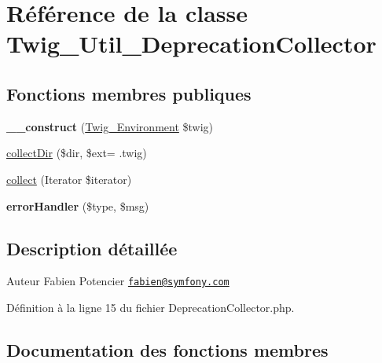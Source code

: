 \hypertarget{class_twig___util___deprecation_collector}{}\section{Référence de la classe Twig\+\_\+\+Util\+\_\+\+Deprecation\+Collector}
\label{class_twig___util___deprecation_collector}
\subsection*{Fonctions membres publiques}
\begin{DoxyCompactItemize}
\item 
{\bfseries \+\_\+\+\_\+construct} (\hyperlink{class_twig___environment}{Twig\+\_\+\+Environment} \$twig)\hypertarget{class_twig___util___deprecation_collector_a3ae6b2b479d74d398b2d4161783f029c}{}\label{class_twig___util___deprecation_collector_a3ae6b2b479d74d398b2d4161783f029c}

\item 
\hyperlink{class_twig___util___deprecation_collector_a143e2c1552dc387f641df324128a2d3a}{collect\+Dir} (\$dir, \$ext= \textquotesingle{}.twig\textquotesingle{})
\item 
\hyperlink{class_twig___util___deprecation_collector_a72236c842cab8f73c3323f5b83b45bb2}{collect} (Iterator \$iterator)
\item 
{\bfseries error\+Handler} (\$type, \$msg)\hypertarget{class_twig___util___deprecation_collector_a1615d0d9ad54d515605692a70756eb91}{}\label{class_twig___util___deprecation_collector_a1615d0d9ad54d515605692a70756eb91}

\end{DoxyCompactItemize}


\subsection{Description détaillée}
\begin{DoxyAuthor}{Auteur}
Fabien Potencier \href{mailto:fabien@symfony.com}{\tt fabien@symfony.\+com} 
\end{DoxyAuthor}


Définition à la ligne 15 du fichier Deprecation\+Collector.\+php.



\subsection{Documentation des fonctions membres}
